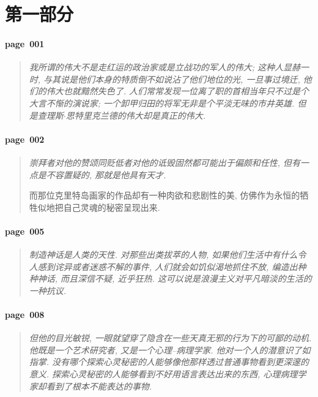 \section{第一部分}

\paragraph*{page~001}
\begin{quotation}
    \itshape
    我所谓的伟大不是走红运的政治家或是立战功的军人的伟大; 这种人显赫一时, 与其说是他们本身的特质倒不如说沾了他们地位的光, 一旦事过境迁, 他们的伟大也就黯然失色了. 人们常常发现一位离了职的首相当年只不过是个大言不惭的演说家; 一个卸甲归田的将军无非是个平淡无味的市井英雄. 但是查理斯$\cdot$思特里克兰德的伟大却是真正的伟大. 
\end{quotation}

\paragraph*{page~002}
\begin{quotation}
    \itshape
    崇拜者对他的赞颂同贬低者对他的诋毁固然都可能出于偏颇和任性, 但有一点是不容置疑的, 那就是他具有天才.

    而那位克里特岛画家的作品却有一种肉欲和悲剧性的美, 仿佛作为永恒的牺牲似地把自己灵魂的秘密呈现出来.
\end{quotation}

\paragraph*{page~005}
\begin{quotation}
    \itshape
    制造神话是人类的天性. 对那些出类拔萃的人物, 如果他们生活中有什么令人感到诧异或者迷惑不解的事件, 人们就会如饥似渴地抓住不放, 编造出种种神话, 而且深信不疑, 近乎狂热. 这可以说是浪漫主义对平凡暗淡的生活的一种抗议. 
\end{quotation}

\paragraph*{page~008}
\begin{quotation}
    \itshape
    但他的目光敏锐, 一眼就望穿了隐含在一些天真无邪的行为下的可鄙的动机. 他既是一个艺术研究者, 又是一个心理--病理学家. 他对一个人的潜意识了如指掌. 没有哪个探索心灵秘密的人能够像他那样透过普通事物看到更深邃的意义. 探索心灵秘密的人能够看到不好用语言表达出来的东西, 心理病理学家却看到了根本不能表达的事物.
\end{quotation}

